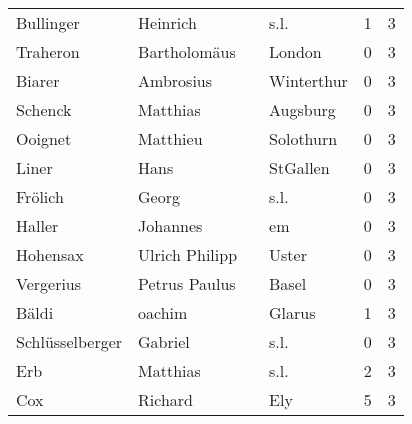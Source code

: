 \begin{center}
\begin{tiny}
\begin{longtabu}{llllrr}
                Bullinger &                           Heinrich &             &                                        s.l. &          1 &         3 \\
                 Traheron &                       Bartholomäus &             &                                      London &          0 &         3 \\
                   Biarer &                          Ambrosius &             &                                  Winterthur &          0 &         3 \\
                  Schenck &                           Matthias &             &                                    Augsburg &          0 &         3 \\
                  Ooignet &                           Matthieu &             &                                   Solothurn &          0 &         3 \\
                    Liner &                               Hans &             &                                    StGallen &          0 &         3 \\
                  Frölich &                              Georg &             &                                        s.l. &          0 &         3 \\
                   Haller &                           Johannes &             &                                          em &          0 &         3 \\
                 Hohensax &                     Ulrich Philipp &             &                                       Uster &          0 &         3 \\
                Vergerius &                      Petrus Paulus &             &                                       Basel &          0 &         3 \\
                    Bäldi &                             oachim &             &                                      Glarus &          1 &         3 \\
          Schlüsselberger &                            Gabriel &             &                                        s.l. &          0 &         3 \\
                      Erb &                           Matthias &             &                                        s.l. &          2 &         3 \\
                      Cox &                            Richard &             &                                         Ely &          5 &         3 \\

\end{longtabu}
\end{tiny}
\end{center}

